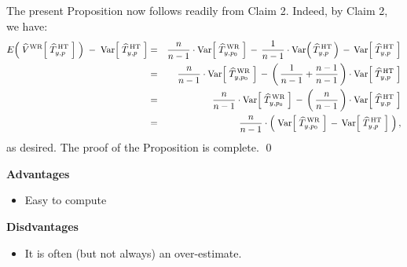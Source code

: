 \vskip 0.8cm
\noindent
The present Proposition now follows readily from Claim 2.
Indeed, by Claim 2, we have:
\begin{eqnarray*}
E\!\left(\;\widehat{V}^{\textnormal{WR}}\!\left[\;\widehat{T}^{\,\textnormal{HT}}_{y,p}\;\right]\;\right)
\; - \; \Var\!\left[\;\widehat{T}^{\,\textnormal{HT}}_{y,p}\;\right]
& = &
	\dfrac{n}{n-1} \cdot \Var\!\left[\;\widehat{T}^{\,\textnormal{WR}}_{y,p_{0}}\;\right]
	\,-\,
	\dfrac{1}{n-1} \cdot \Var\!\left(\,\widehat{T}^{\,\textnormal{HT}}_{y,p}\,\right)
	\, - \,
	\Var\!\left[\;\widehat{T}^{\,\textnormal{HT}}_{y,p}\;\right]
\\
& = &
	\dfrac{n}{n-1} \cdot \Var\!\left[\;\widehat{T}^{\,\textnormal{WR}}_{y,p_{0}}\;\right]
	\,-\,
	\left(\,\dfrac{1}{n-1} + \dfrac{n-1}{n-1}\,\right)
		\cdot
		\Var\!\left[\;\widehat{T}^{\,\textnormal{HT}}_{y,p}\;\right]
\\
& = &
	\dfrac{n}{n-1} \cdot \Var\!\left[\;\widehat{T}^{\,\textnormal{WR}}_{y,p_{0}}\;\right]
	\,-\,
	\left(\,\dfrac{n}{n-1}\,\right)
		\cdot
		\Var\!\left[\;\widehat{T}^{\,\textnormal{HT}}_{y,p}\;\right]
\\
& = &
	\dfrac{n}{n-1} \cdot
	\left(\;
		\Var\!\left[\;\widehat{T}^{\,\textnormal{WR}}_{y,p_{0}}\;\right]
		\,-\,
		\Var\!\left[\;\widehat{T}^{\,\textnormal{HT}}_{y,p}\;\right]
		\;\right),
\end{eqnarray*}
as desired.
The proof of the Proposition is complete.
\qed

\vskip 0.5cm
\noindent
\textbf{Advantages}
\begin{itemize}
\item
	Easy to compute
\end{itemize}

\vskip 0.5cm
\noindent
\textbf{Disdvantages}
\begin{itemize}
\item
	It is often (but not always) an over-estimate.
\end{itemize}

